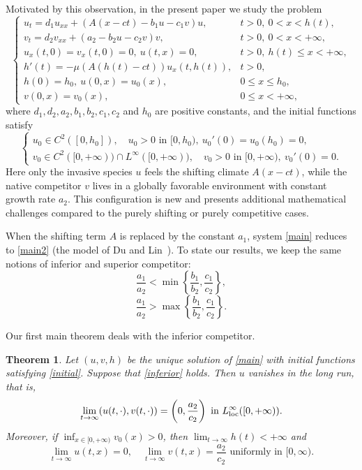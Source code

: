 \documentclass[reqno]{amsart}
\theoremstyle{plain}
\newtheorem{theorem}{Theorem}
\theoremstyle{definition}
\theoremstyle{remark}
\begin{document}
	Motivated by this observation, in the present paper we study the problem
	\begin{equation}\label{main}
		\begin{cases}
			u_t = d_1u_{xx} + (A(x - ct) - b_1u - c_1 v) u, & t > 0,~ 0 < x < h(t), \\
			v_t = d_2v_{xx} + (a_2 - b_2u - c_2v)v,          & t > 0,~ 0 < x < +\infty, \\
			u_x(t, 0) = v_x(t, 0) = 0, ~ u(t, x) = 0,        & t > 0, ~ h(t) \leq x < +\infty, \\
			h'(t) = -\mu (A(h(t) - ct))u_x(t, h(t)),          & t > 0, \\
			h(0)=h_0,~ u(0, x) = u_0(x),                       & 0 \leq x \leq h_0, \\
			v(0, x) = v_0(x),                                  & 0 \le x < +\infty,
		\end{cases}
	\end{equation}
	where $d_1,d_2,a_2,b_1,b_2,c_1,c_2$ and $h_0$ are positive constants, and the initial functions satisfy
	\begin{equation}\label{initial}
		\begin{cases}
			u_0 \in C^2([0,h_0]),\quad u_0 > 0 \text{ in } [0,h_0), ~ u_0'(0) = u_0(h_0) = 0,\\
			v_0 \in C^2([0,+\infty)) \cap L^\infty([0,+\infty)),\quad v_0 > 0 \text{ in } [0,+\infty), ~ v_0'(0) = 0.
		\end{cases}
	\end{equation}
	Here only the invasive species $u$ feels the shifting climate $A(x-ct)$, while the native competitor $v$ lives in a globally favorable environment with constant growth rate $a_2$. This configuration is new and presents additional mathematical challenges compared to the purely shifting or purely competitive cases.
	
	When the shifting term $A$ is replaced by the constant $a_1$, system \eqref{main} reduces to \eqref{main2} (the model of Du and Lin~\cite{MR3327894}). To state our results, we keep the same notions of inferior and superior competitor:
	\begin{equation}\label{inferior}
		\frac{a_1}{a_2} < \min\left\{\frac{b_1}{b_2}, \frac{c_1}{c_2}\right\},
	\end{equation}
	\begin{equation}\label{superior}
		\frac{a_1}{a_2} > \max\left\{\frac{b_1}{b_2}, \frac{c_1}{c_2}\right\}.
	\end{equation}
	
	Our first main theorem deals with the inferior competitor.
	\begin{theorem}\label{th:inferior}
		Let $(u, v, h)$ be the unique solution of \eqref{main} with initial functions satisfying \eqref{initial}. Suppose that \eqref{inferior} holds. Then $u$ vanishes in the long run, that is,
		\[
		\lim_{t\to\infty} (u(t,\cdot), v(t,\cdot))
		= \left(0, \frac{a_2}{c_2}\right) \text{ in } L^\infty_{\rm loc}([0,+\infty)).
		\]
		Moreover, if $\inf_{x\in[0,+\infty)} v_0(x) > 0$, then $\lim_{t\to\infty} h(t) < +\infty$ and
		\[
		\lim_{t\to\infty} u(t,x) = 0,\quad \lim_{t\to\infty} v(t,x) = \frac{a_2}{c_2} \text{ uniformly in } [0, \infty).
		\]
	\end{theorem}
	
\end{document}
